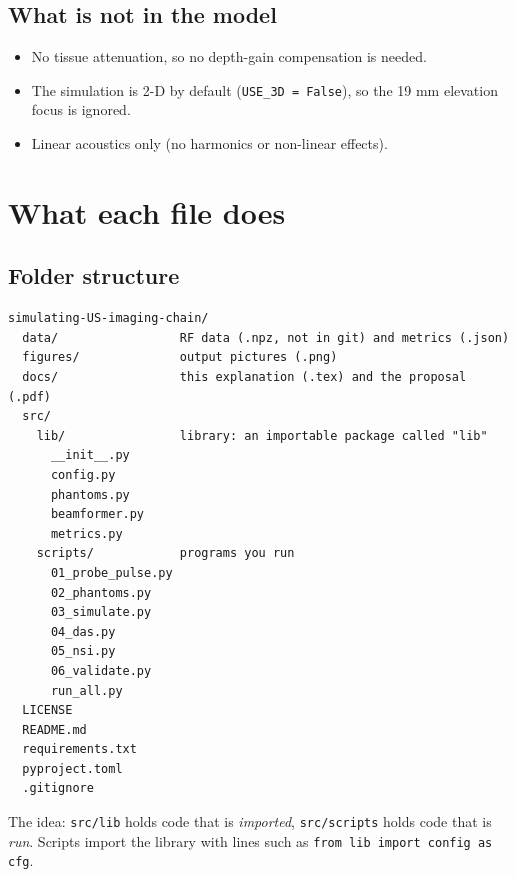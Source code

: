 \documentclass[11pt,a4paper]{article}
\newcommand{\file}[1]{\texttt{#1}}
\begin{document}
\subsection{What is not in the model}
\begin{itemize}
\item No tissue attenuation, so no depth-gain compensation is needed.
\item The simulation is 2-D by default (\texttt{USE\_3D = False}), so the 19 mm elevation focus is ignored.
\item Linear acoustics only (no harmonics or non-linear effects).
\end{itemize}

\section{What each file does}

\subsection{Folder structure}
\begin{verbatim}
simulating-US-imaging-chain/
  data/                 RF data (.npz, not in git) and metrics (.json)
  figures/              output pictures (.png)
  docs/                 this explanation (.tex) and the proposal (.pdf)
  src/
    lib/                library: an importable package called "lib"
      __init__.py
      config.py
      phantoms.py
      beamformer.py
      metrics.py
    scripts/            programs you run
      01_probe_pulse.py
      02_phantoms.py
      03_simulate.py
      04_das.py
      05_nsi.py
      06_validate.py
      run_all.py
  LICENSE
  README.md
  requirements.txt
  pyproject.toml
  .gitignore
\end{verbatim}
The idea: \file{src/lib} holds code that is \emph{imported}, \file{src/scripts} holds code that is \emph{run}. Scripts import the library with lines such as \texttt{from lib import config as cfg}.
\end{document}
